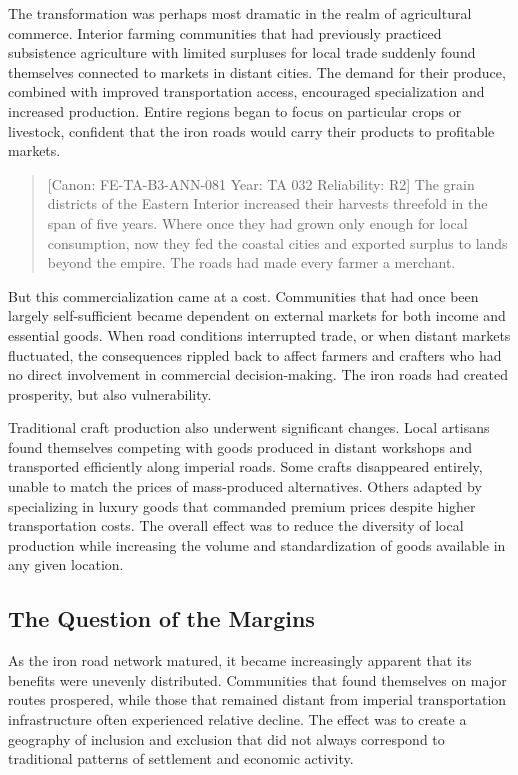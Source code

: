 The transformation was perhaps most dramatic in the realm of
agricultural commerce. Interior farming communities that had previously
practiced subsistence agriculture with limited surpluses for local trade
suddenly found themselves connected to markets in distant cities. The
demand for their produce, combined with improved transportation access,
encouraged specialization and increased production. Entire regions began
to focus on particular crops or livestock, confident that the iron roads
would carry their products to profitable markets.

\begin{quote}
{[}Canon: FE-TA-B3-ANN-081 \textbar{} Year: TA 032 \textbar{}
Reliability: R2{]} The grain districts of the Eastern Interior increased
their harvests threefold in the span of five years. Where once they had
grown only enough for local consumption, now they fed the coastal cities
and exported surplus to lands beyond the empire. The roads had made
every farmer a merchant.
\end{quote}

But this commercialization came at a cost. Communities that had once
been largely self-sufficient became dependent on external markets for
both income and essential goods. When road conditions interrupted trade,
or when distant markets fluctuated, the consequences rippled back to
affect farmers and crafters who had no direct involvement in commercial
decision-making. The iron roads had created prosperity, but also
vulnerability.

Traditional craft production also underwent significant changes. Local
artisans found themselves competing with goods produced in distant
workshops and transported efficiently along imperial roads. Some crafts
disappeared entirely, unable to match the prices of mass-produced
alternatives. Others adapted by specializing in luxury goods that
commanded premium prices despite higher transportation costs. The
overall effect was to reduce the diversity of local production while
increasing the volume and standardization of goods available in any
given location.

\subsection{The Question of the
Margins}\label{the-question-of-the-margins}

As the iron road network matured, it became increasingly apparent that
its benefits were unevenly distributed. Communities that found
themselves on major routes prospered, while those that remained distant
from imperial transportation infrastructure often experienced relative
decline. The effect was to create a geography of inclusion and exclusion
that did not always correspond to traditional patterns of settlement and
economic activity.

